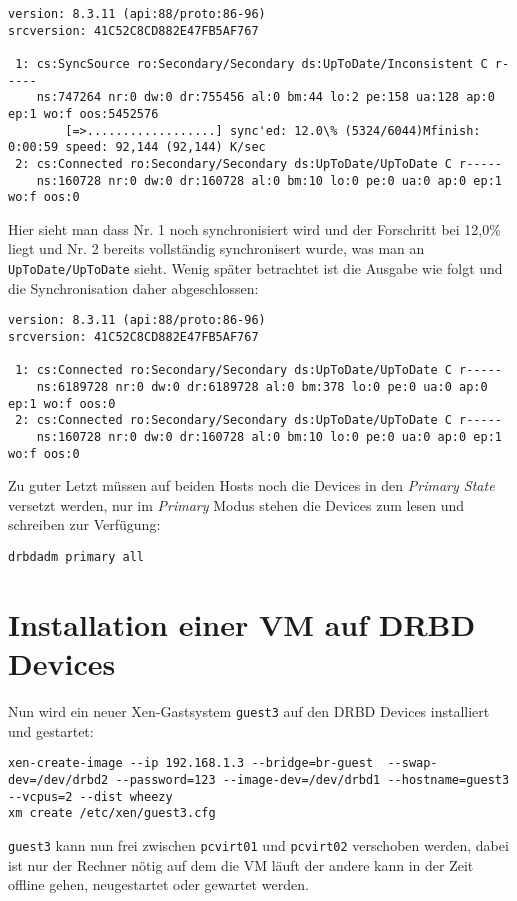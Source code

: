 \setupVerbatimOut
\begin{verbatim}
version: 8.3.11 (api:88/proto:86-96)
srcversion: 41C52C8CD882E47FB5AF767 

 1: cs:SyncSource ro:Secondary/Secondary ds:UpToDate/Inconsistent C r-----
    ns:747264 nr:0 dw:0 dr:755456 al:0 bm:44 lo:2 pe:158 ua:128 ap:0 ep:1 wo:f oos:5452576
        [=>..................] sync'ed: 12.0\% (5324/6044)Mfinish: 0:00:59 speed: 92,144 (92,144) K/sec
 2: cs:Connected ro:Secondary/Secondary ds:UpToDate/UpToDate C r-----
    ns:160728 nr:0 dw:0 dr:160728 al:0 bm:10 lo:0 pe:0 ua:0 ap:0 ep:1 wo:f oos:0
\end{verbatim}
Hier sieht man dass Nr. 1 noch synchronisiert wird und der  Forschritt bei 12,0\% liegt und  Nr. 2 bereits vollständig synchronisert wurde, was man an \verb#UpToDate/UpToDate# sieht.
Wenig später betrachtet ist die Ausgabe wie folgt und die Synchronisation daher abgeschlossen:

\setupVerbatimOut
\begin{verbatim}
version: 8.3.11 (api:88/proto:86-96)
srcversion: 41C52C8CD882E47FB5AF767 

 1: cs:Connected ro:Secondary/Secondary ds:UpToDate/UpToDate C r-----
    ns:6189728 nr:0 dw:0 dr:6189728 al:0 bm:378 lo:0 pe:0 ua:0 ap:0 ep:1 wo:f oos:0
 2: cs:Connected ro:Secondary/Secondary ds:UpToDate/UpToDate C r-----
    ns:160728 nr:0 dw:0 dr:160728 al:0 bm:10 lo:0 pe:0 ua:0 ap:0 ep:1 wo:f oos:0
\end{verbatim}

Zu guter Letzt müssen auf beiden Hosts noch die Devices in den \emph{Primary State} versetzt werden, nur im \emph{Primary} Modus stehen die Devices zum lesen und schreiben zur Verfügung:
\setupVerbatimOut
\begin{verbatim}
drbdadm primary all
\end{verbatim}

\section{Installation einer VM auf DRBD Devices}
Nun wird ein neuer Xen-Gastsystem \verb#guest3# auf den DRBD Devices installiert und gestartet:
\setupVerbatimOut
\begin{verbatim}
xen-create-image --ip 192.168.1.3 --bridge=br-guest  --swap-dev=/dev/drbd2 --password=123 --image-dev=/dev/drbd1 --hostname=guest3 --vcpus=2 --dist wheezy
xm create /etc/xen/guest3.cfg
\end{verbatim}

\verb|guest3| kann nun frei zwischen \verb#pcvirt01# und \verb#pcvirt02# verschoben werden, dabei ist nur der Rechner nötig auf dem die VM läuft der andere kann in der Zeit offline gehen, neugestartet oder gewartet werden.
